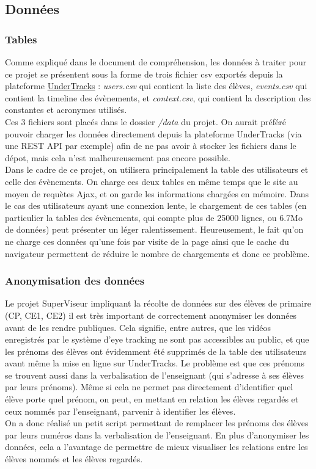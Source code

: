 \documentclass{article}
\begin{document}
\subsection{Données}
\subsubsection{Tables}
Comme expliqué dans le document de compréhension, les données à traiter pour ce projet se présentent sous la forme de trois fichier csv exportés depuis la plateforme \href{https://undertracks.imag.fr/}{UnderTracks} : \textit{users.csv} qui contient la liste des élèves, \textit{events.csv} qui contient la timeline des évènements, et \textit{context.csv}, qui contient la description des constantes et acronymes utilisés.\\
Ces 3 fichiers sont placés dans le dossier \textit{/data} du projet. On aurait préféré pouvoir charger les données directement depuis la plateforme UnderTracks (via une REST API par exemple) afin de ne pas avoir à stocker les fichiers dans le dépot, mais cela n'est malheureusement pas encore possible.\\
Dans le cadre de ce projet, on utilisera principalement la table des utilisateurs et celle des évènements. On charge ces deux tables en même temps que le site au moyen de requètes Ajax, et on garde les informations chargées en mémoire. Dans le cas des utilisateurs ayant une connexion lente, le chargement de ces tables (en particulier la tables des évènements, qui compte plus de 25000 lignes, ou 6.7Mo de données) peut présenter un léger ralentissement. Heureusement, le fait qu'on ne charge ces données qu'une fois par visite de la page ainsi que le cache du navigateur permettent de réduire le nombre de chargements et donc ce problème.

\subsubsection{Anonymisation des données}
Le projet SuperViseur impliquant la récolte de données sur des élèves de primaire (CP, CE1, CE2) il est très important de correctement anonymiser les données avant de les rendre publiques. Cela signifie, entre autres, que les vidéos enregistrés par le système d'eye tracking ne sont pas accessibles au public, et que les prénoms des élèves ont évidemment été supprimés de la table des utilisateurs avant même la mise en ligne sur UnderTracks. Le problème est que ces prénoms se trouvent aussi dans la verbalisation de l'enseignant (qui s'adresse à ses élèves par leurs prénoms). Même si cela ne permet pas directement d'identifier quel élève porte quel prénom, on peut, en mettant en relation les élèves regardés et ceux nommés par l'enseignant, parvenir à identifier les élèves.\\
On a donc réalisé un petit script permettant de remplacer les prénoms des élèves par leurs numéros dans la verbalisation de l'enseignant. En plus d'anonymiser les données, cela a l'avantage de permettre de mieux visualiser les relations entre les élèves nommés et les élèves regardés.
\end{document}

